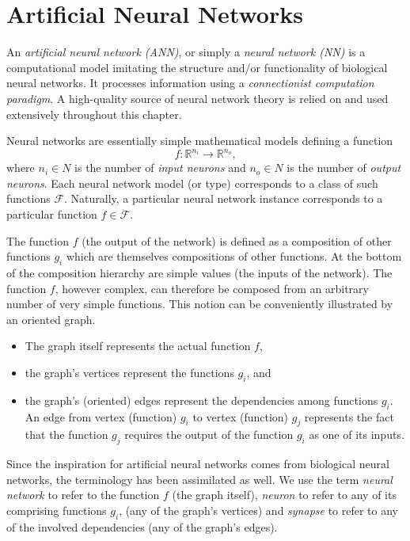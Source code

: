 \chapter{Artificial Neural Networks}

An \textit{artificial neural network (ANN)}, or simply a \textit{neural network (NN)} is a computational model imitating the structure and/or functionality of biological neural networks. It processes information using a \textit{connectionist computation paradigm}. A high-quality source of neural network theory \cite{Sima96} is relied on and used extensively throughout this chapter. 

Neural networks are essentially simple mathematical models defining a function
$$ f : \mathbb{R}^{n_i} \rightarrow \mathbb{R}^{n_o}, $$
where $ n_i \in N $ is the number of \textit{input neurons} and $ n_o \in N $ is the number of \textit{output neurons}. Each neural network model (or type)
corresponds to a class of such functions $ \mathcal{F} $. Naturally, a particular neural network instance corresponds to a particular function $ f \in \mathcal{F} $.

The function $ f $ (the output of the network) is defined as a composition of other functions $ g_i $ which are themselves compositions of other functions. At the bottom of the composition hierarchy are simple values (the inputs of the network). The function $ f $, however complex, can therefore be composed from an arbitrary number of very simple functions. This notion can be conveniently illustrated by an oriented graph.

\begin{itemize}
\item The graph itself represents the actual function $ f $,
\item the graph's vertices represent the functions $ g_i $, and
\item the graph's (oriented) edges represent the dependencies among functions $ g_i $. An edge from vertex (function) $ g_i $ to vertex (function) $ g_j $ represents the fact that the function $ g_j $ requires the output of the function $ g_i $ as one of its inputs.
\end{itemize}

Since the inspiration for artificial neural networks comes from biological neural networks, the terminology has been assimilated as well. We use the term \textit{neural network} to refer to the function $ f $ (the graph itself), \textit{neuron} to refer to any of its comprising functions $ g_i $, (any of the graph's vertices) and \textit{synapse} to refer to any of the involved dependencies (any of the graph's edges).

